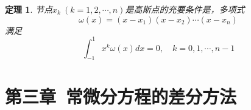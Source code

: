 \documentclass[fontset=ubuntu]{ctexart}
\newtheorem{theorem}{定理}
\numberwithin{equation}{section}
\numberwithin{theorem}{section}
\begin{document}
\begin{multicols}{2}
    \begin{theorem}
        节点$x_k\ (k=1,2,\cdots,n)$是高斯点的充要条件是，多项式
        \begin{equation*}
            \omega(x)=(x-x_1)(x-x_2)\cdots(x-x_n)
        \end{equation*}
        满足
        \begin{equation*}
            \int_{-1}^{1}x^k\omega(x)dx = 0,\quad k=0,1,\cdots,n-1
        \end{equation*}
    \end{theorem}

\end{multicols}


\section{第三章\ 常微分方程的差分方法}
\end{document}
